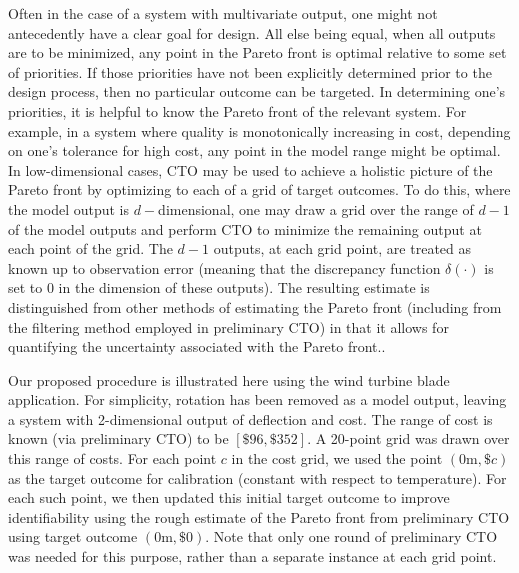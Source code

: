 \documentclass[12pt]{article}
\begin{document}
Often in the case of a system with multivariate output, one might not antecedently have a clear goal for design.
%
All else being equal, when all outputs are to be minimized, any point in the Pareto front is optimal relative to some set of priorities.
%
If those priorities have not been explicitly determined prior to the design process, then no particular outcome can be targeted.
%
In determining one's priorities, it is helpful to know the Pareto front of the relevant system.
%
For example, in a system where quality is monotonically increasing in cost, depending on one's tolerance for high cost, any point in the model range might be optimal.
%
%
In low-dimensional cases, CTO may be used to achieve a holistic picture of the Pareto front by optimizing to each of a grid of target outcomes.
%
To do this, where the model output is $d-$dimensional, one may draw a grid over the range of $d-1$ of the model outputs and perform CTO to minimize the remaining output at each point of the grid.
%
The $d-1$ outputs, at each grid point, are treated as known up to observation error (meaning that the discrepancy function $\delta(\cdot)$ is set to 0 in the dimension of these outputs).
%
The resulting estimate is distinguished from other methods of estimating the Pareto front (including from the filtering method employed in preliminary CTO) in that it allows for quantifying the uncertainty associated with the Pareto front..
%

Our proposed procedure is illustrated here using the wind turbine blade application.
%
For simplicity, rotation has been removed as a model output, leaving a system with 2-dimensional output of deflection and cost. 
%
The range of cost is known (via preliminary CTO) to be $[\$96,\$352]$.
%
A 20-point grid was drawn over this range of costs. 
%
%
For each point $c$ in the cost grid, we used the point $(0\mathrm m,\$c)$ as the target outcome for calibration (constant with respect to temperature).
%
For each such point, we then updated this initial target outcome to improve identifiability using the rough estimate of the Pareto front from preliminary CTO using target outcome $(0\mathrm m,\$0)$.
%
Note that only one round of preliminary CTO was needed for this purpose, rather than a separate instance at each grid point.
%
\end{document}
